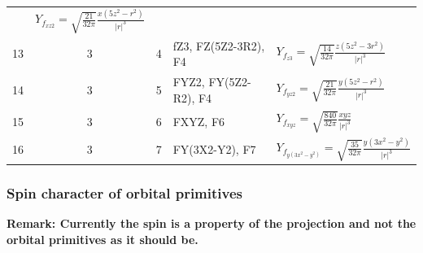 \documentclass[final,12pt,makeidx,DIV=calc]{article}
\begin{document}
{{{{{{\begin{table}[!hbt]
\begin{center}
\begin{tabular}{|r|c|c|l|l|}
   & $Y_{f_{xz2}}=\sqrt{\frac{21}{32\pi}} \frac{x(5z^2-r^2)}{|r|^3}$\\
13 & 3 & 4 & fZ3, FZ(5Z2-3R2), F4
   & $Y_{f_{z3}}=\sqrt{\frac{14}{32\pi}} \frac{z(5z^2-3r^2)}{|r|^3}$\\
14 & 3 & 5 & FYZ2, FY(5Z2-R2), F4
   & $Y_{f_{yz2}}=\sqrt{\frac{21}{32\pi}} \frac{y(5z^2-r^2)}{|r|^3}$\\
15 & 3 & 6 & FXYZ, F6
   & $Y_{f_{xyz}}=\sqrt{\frac{840}{32\pi}} \frac{xyz}{|r|^3}$\\
16 & 3 & 7 & FY(3X2-Y2), F7
   & $Y_{f_{y(3x^2-y^2)}}=\sqrt{\frac{35}{32\pi}} \frac{y(3x^2-y^2)}{|r|^3}$\\
\hline
\end{tabular}
\end{center}
\end{table}


\subsubsection{Spin character of orbital primitives}

\textbf{Remark: Currently the spin is a property of the projection and
  not the orbital primitives as it should be.}

}}}}}}
\end{document}
